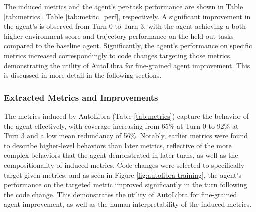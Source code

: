 The induced metrics and the agent's per-task performance are shown in Table \ref{tab:metrics}, Table \ref{tab:metric_perf}, respectively. A significant improvement in the agent's is observed from Turn 0 to Turn 3, with the agent achieving a both higher environment score and trajectory performance on the held-out tasks compared to the baseline agent. Significantly, the agent's performance on specific metrics increased correspondingly to code changes targeting those metrics, demonstrating the utility of AutoLibra for fine-grained agent improvement. This is discussed in more detail in the following sections.

\subsubsection{Extracted Metrics and Improvements}
The metrics induced by AutoLibra (Table \ref{tab:metrics}) capture the behavior of the agent effectively, with coverage increasing from 65\% at Turn 0 to 92\% at Turn 3 and a low mean redundancy of 56\%. Notably, earlier metrics were found to describe higher-level behaviors than later metrics, reflective of the more complex behaviors that the agent demonstrated in later turns, as well as the compositionality of induced metrics. Code changes were selected to specifically target given metrics, and as seen in Figure \ref{fig:autolibra-training}, the agent's performance on the targeted metric improved significantly in the turn following the code change. This demonstrates the utility of AutoLibra for fine-grained agent improvement, as well as the human interpretability of the induced metrics.

